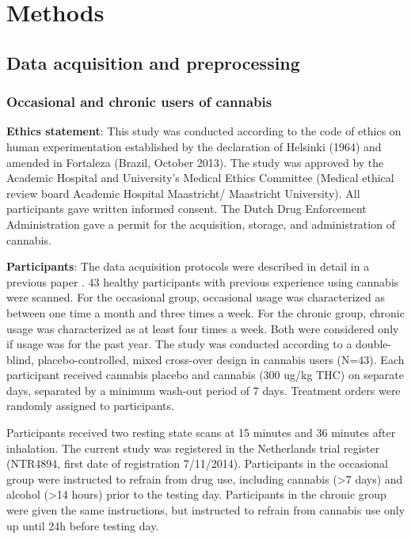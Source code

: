 
    \chapter{Methods}
\section{Data acquisition and preprocessing}
\subsection{Occasional and chronic users of cannabis} 

\textbf{Ethics statement}:
This study was conducted according to the code of ethics on human
experimentation established by the declaration of Helsinki (1964) and
amended in Fortaleza (Brazil, October 2013). The study was approved by
the Academic Hospital and University's Medical Ethics Committee (Medical
ethical review board Academic Hospital Maastricht/ Maastricht
University). All participants gave written informed consent. The Dutch
Drug Enforcement Administration gave a permit for the acquisition,
storage, and administration of cannabis.

\textbf{Participants}: The data acquisition protocols were described in
detail in a previous paper \parencite{Ramaekers2022}. 43 healthy
participants with previous experience using cannabis were scanned. For
the occasional group, occasional usage was characterized as between one
time a month and three times a week. For the chronic group, chronic
usage was characterized as at least four times a week. Both were
considered only if usage was for the past year. The study was conducted
according to a double-blind, placebo-controlled, mixed cross-over design
in cannabis users (N=43). Each participant received cannabis placebo and
cannabis (300 ug/kg THC) on separate days, separated by a minimum
wash-out period of 7 days. Treatment orders were randomly assigned to
participants.

Participants received two resting state scans at 15 minutes and 36
minutes after inhalation. The current study was registered in the
Netherlands trial register (NTR4894, first date of registration
7/11/2014). Participants in the occasional group were instructed to
refrain from drug use, including cannabis (\textgreater7 days) and
alcohol (\textgreater14 hours) prior to the testing day. Participants in
the chronic group were given the same instructions, but instructed to
refrain from cannabis use only up until 24h before testing day.

